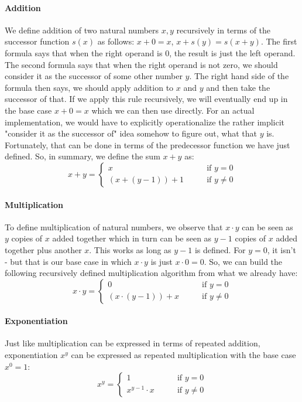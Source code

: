 \paragraph{Addition}
We define addition of two natural numbers $x,y$ recursively in terms of the successor function $s(x)$ as follows: $x + 0 = x$, $x + s(y) = s(x + y)$. The first formula says that when the right operand is $0$, the result is just the left operand. The second formula says that when the right operand is not zero, we should consider it as the successor of some other number $y$. The right hand side of the formula then says, we should apply addition to $x$ and $y$ and then take the successor of that. If we apply this rule recursively, we will eventually end up in the base case $x + 0 = x$ which we can then use directly. For an actual implementation, we would have to explicitly operationalize the rather implicit "consider it as the successor of" idea somehow to figure out, what that $y$ is. Fortunately, that can be done in terms of the predecessor function we have just defined. So, in summary, we define the sum $x+y$ as:
\begin{equation}
x+y =\begin{cases}
 x            & \qquad \text{if } y   =  0 \\
 (x+(y-1))+1  & \qquad \text{if } y \neq 0 
\end{cases}
\end{equation}

\paragraph{Multiplication}
To define multiplication of natural numbers, we observe that $x \cdot y$ can be seen as $y$ copies of $x$ added together which in turn can be seen as $y-1$ copies of $x$ added together plus another $x$. This works as long as $y-1$ is defined. For $y=0$, it isn't - but that is our base case in which $x \cdot y$ is just $x \cdot 0 = 0$. So, we can build the following recursively defined multiplication algorithm from what we already have:
\begin{equation}
x \cdot y =\begin{cases}
 0                    & \qquad \text{if } y   =  0 \\
 (x \cdot (y-1)) + x  & \qquad \text{if } y \neq 0 
\end{cases}
\end{equation}

\paragraph{Exponentiation} Just like multiplication can be expressed in terms of repeated addition, exponentiation $x^y$ can be expressed as repeated multiplication with the base case $x^0 = 1$:
\begin{equation}
x^y =\begin{cases}
 1                  & \qquad \text{if } y   =  0 \\
 x ^{y-1}  \cdot x  & \qquad \text{if } y \neq 0 
\end{cases}
\end{equation}

